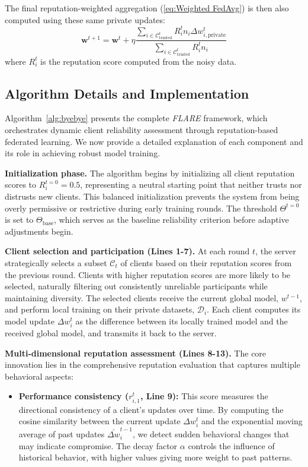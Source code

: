 \documentclass[lettersize,journal]{IEEEtran}
\begin{document}
{The final reputation-weighted aggregation (\cref{eq:Weighted FedAvg}) is then also computed using these same private updates:
\begin{equation}
\mathbf{w}^{t+1} = \mathbf{w}^t + \eta \frac{\sum_{i \in \mathcal{C}_{\text{trusted}}^t} R_i^t n_i \Delta w_{i, \text{private}}^t}{\sum_{i \in \mathcal{C}_{\text{trusted}}^t} R_i^t n_i}
\label{eq:private_agg}
\end{equation}
where $R_i^t$ is the reputation score computed from the noisy data.


\subsection{Algorithm Details and Implementation}

Algorithm~\ref{alg:byebye} presents the complete \textit{FLARE} framework, which orchestrates dynamic client reliability assessment through reputation-based federated learning. We now provide a detailed explanation of each component and its role in achieving robust model training.

\textbf{Initialization phase.} The algorithm begins by initializing all client reputation scores to $R_i^{t=0} = 0.5$, representing a neutral starting point that neither trusts nor distrusts new clients. This balanced initialization prevents the system from being overly permissive or restrictive during early training rounds. The threshold $\Theta^{t=0}$ is set to $\Theta_{\text{base}}$, which serves as the baseline reliability criterion before adaptive adjustments begin.

\textbf{Client selection and participation (Lines 1-7).} At each round $t$, the server strategically selects a subset $\mathcal{C}_t$ of clients based on their reputation scores from the previous round. Clients with higher reputation scores are more likely to be selected, naturally filtering out consistently unreliable participants while maintaining diversity. The selected clients receive the current global model, $w^{t-1}$, and perform local training on their private datasets, $\mathcal{D}_i$. Each client computes its model update $\Delta w_i^t$ as the difference between its locally trained model and the received global model, and transmits it back to the server.

\textbf{Multi-dimensional reputation assessment (Lines 8-13).} The core innovation lies in the comprehensive reputation evaluation that captures multiple behavioral aspects:

\begin{itemize}[wide]
   \item \textbf{Performance consistency ($r_{i,1}^t$, Line 9):} This score measures the directional consistency of a client's updates over time. By computing the cosine similarity between the current update $\Delta w_i^t$ and the exponential moving average of past updates $\bar{\Delta w}_i^{t-1}$, we detect sudden behavioral changes that may indicate compromise. The decay factor $\alpha$ controls the influence of historical behavior, with higher values giving more weight to past patterns.
   

\end{itemize}}
\end{document}
